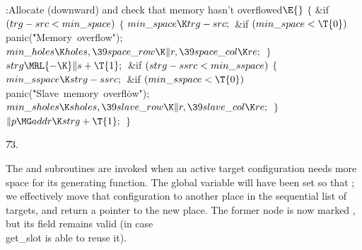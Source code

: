 \B{}:Allocate  (downward) and
check that memory hasn't overflowed\X${}\E{}$\6
${}\{{}$\1\6
\&{if} ${}(\\{trg}-\\{src}<\\{min\_space}){}$\5
${}\{{}$\1\6
${}\\{min\_space}\K\\{trg}-\\{src};{}$\6
\&{if} ${}(\\{min\_space}<\T{0}){}$\1\5
\\{panic}(\.{"Memory\ overflow"});\2\6
${}\\{min\_holes}\K\\{holes},\39\\{space\_row}\K\|r,\39\\{space\_col}\K%
\\{re};{}$\6
\4${}\}{}$\2\6
${}\\{strg}\MRL{-{\K}}\|s+\T{1};{}$\6
\&{if} ${}(\\{strg}-\\{ssrc}<\\{min\_sspace}){}$\5
${}\{{}$\1\6
${}\\{min\_sspace}\K\\{strg}-\\{ssrc};{}$\6
\&{if} ${}(\\{min\_sspace}<\T{0}){}$\1\5
\\{panic}(\.{"Slave\ memory\ overfl}\)\.{ow"});\2\6
${}\\{min\_sholes}\K\\{sholes},\39\\{slave\_row}\K\|r,\39\\{slave\_col}\K%
\\{re};{}$\6
\4${}\}{}$\2\6
${}\|p\MG\\{addr}\K\\{strg}+\T{1};{}$\6
\4${}\}{}$\2\par
\U73.\fi

The  and  subroutines
are invoked when an
active target configuration  needs more space for its generating
function. The global variable  will have been set so that
; we effectively move that configuration
to another
place in the sequential list of targets,
and return a pointer to the new place.
The former node  is now marked , but its 
field remains valid (in case \\{get\_slot} is able to reuse it).

